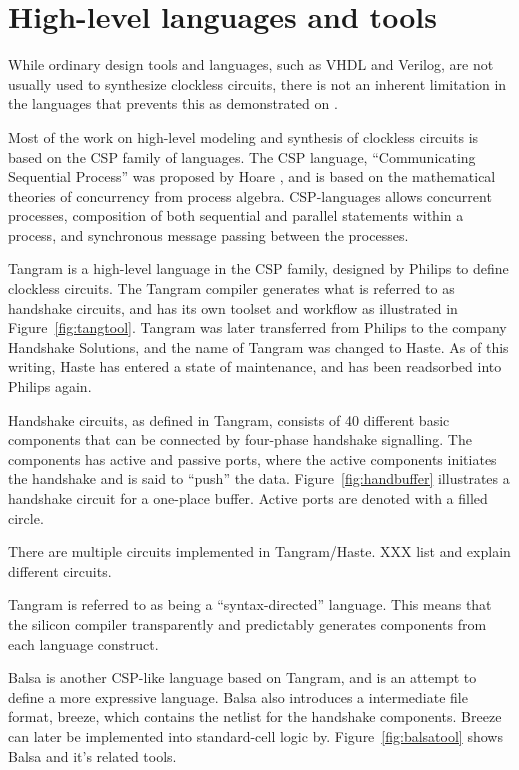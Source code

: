 \section{High-level languages and tools}

While ordinary design tools and languages, such as VHDL and Verilog, are not
usually used to synthesize clockless circuits, there is not an
inherent limitation in the languages that prevents this as
demonstrated on \cite[pp. 135-137]{sparso}.

Most of the work on high-level modeling and synthesis of clockless
circuits is based on the CSP family of languages. The CSP language,
``Communicating Sequential Process'' was proposed by Hoare \cite{xxx},
and is based on the mathematical theories of concurrency from process
algebra. CSP-languages allows concurrent processes, composition of
both sequential and parallel statements within a process, and
synchronous message passing between the processes.

Tangram is a high-level language in the CSP family, designed by
Philips to define clockless circuits. The Tangram compiler generates
what is referred to as handshake circuits, and has its own toolset and
workflow as illustrated in Figure~\ref{fig:tangtool}. Tangram was
later transferred from Philips to the company Handshake Solutions, and
the name of Tangram was changed to Haste. As of this writing, Haste
has entered a state of maintenance, and has been readsorbed into
Philips again.

Handshake circuits, as defined in Tangram, consists of 40 different
basic components that can be connected by four-phase handshake
signalling. The components has active and passive ports, where the
active components initiates the handshake and is said to ``push'' the
data. Figure~\ref{fig:handbuffer} illustrates a handshake circuit for
a one-place buffer. Active ports are denoted with a filled circle.

There are multiple circuits implemented in Tangram/Haste. XXX list and
explain different circuits.

Tangram is referred to as being a ``syntax-directed'' language. This
means that the silicon compiler transparently and predictably
generates components from each language construct.

Balsa is another CSP-like language based on Tangram, and is an attempt
to define a more expressive language. Balsa also introduces a
intermediate file format, breeze, which contains the netlist for the
handshake components. Breeze can later be implemented into
standard-cell logic by. Figure~\ref{fig:balsatool} shows Balsa and
it's related tools.

